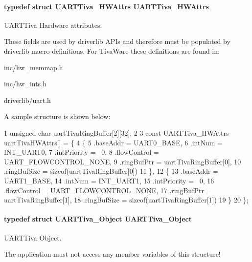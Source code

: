 \paragraph[{U\+A\+R\+T\+Tiva\+\_\+\+H\+W\+Attrs}]{\setlength{\rightskip}{0pt plus 5cm}typedef struct {\bf U\+A\+R\+T\+Tiva\+\_\+\+H\+W\+Attrs}  {\bf U\+A\+R\+T\+Tiva\+\_\+\+H\+W\+Attrs}}\label{_u_a_r_t_tiva_8h_aac0b6013ab2db43424519532f9bf1ef6}


U\+A\+R\+T\+Tiva Hardware attributes. 

These fields are used by driverlib A\+P\+Is and therefore must be populated by driverlib macro definitions. For Tiva\+Ware these definitions are found in\+:
\begin{DoxyItemize}
\item inc/hw\+\_\+memmap.\+h
\item inc/hw\+\_\+ints.\+h
\item driverlib/uart.\+h
\end{DoxyItemize}

A sample structure is shown below\+: 
\begin{DoxyCode}
1 unsigned char uartTivaRingBuffer[2][32];
2 
3 const UARTTiva\_HWAttrs uartTivaHWAttrs[] = \{
4     \{
5         .baseAddr = UART0\_BASE,
6         .intNum = INT\_UART0,
7         .intPriority = ~0,
8         .flowControl = UART\_FLOWCONTROL\_NONE,
9         .ringBufPtr  = uartTivaRingBuffer[0],
10         .ringBufSize = sizeof(uartTivaRingBuffer[0])
11     \},
12     \{
13         .baseAddr = UART1\_BASE,
14         .intNum = INT\_UART1,
15         .intPriority = ~0,
16         .flowControl = UART\_FLOWCONTROL\_NONE,
17         .ringBufPtr  = uartTivaRingBuffer[1],
18         .ringBufSize = sizeof(uartTivaRingBuffer[1])
19     \}
20 \};
\end{DoxyCode}
\paragraph[{U\+A\+R\+T\+Tiva\+\_\+\+Object}]{\setlength{\rightskip}{0pt plus 5cm}typedef struct {\bf U\+A\+R\+T\+Tiva\+\_\+\+Object}  {\bf U\+A\+R\+T\+Tiva\+\_\+\+Object}}\label{_u_a_r_t_tiva_8h_a415fb8fc7172a69540bef335b0ba6735}


U\+A\+R\+T\+Tiva Object. 

The application must not access any member variables of this structure! 
